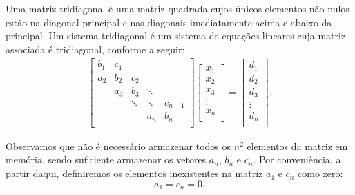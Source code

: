 Uma matriz tridiagonal é uma matriz quadrada cujos únicos elementos não nulos estão na diagonal principal e nas diagonais imediatamente acima e abaixo da principal. Um sistema tridiagonal é um sistema de equações lineares cuja matriz associada é tridiagonal, conforme a seguir:
\begin{eqnarray}\label{linsis:EqTriDiag} \begin{bmatrix}
   {b_1} & {c_1} & {   } & {   } & {   } \\
   {a_2} & {b_2} & {c_2} & {   } & {   } \\
   {   } & {a_3} & {b_3} & \ddots & {   } \\
   {   } & {   } & \ddots & \ddots & {c_{n-1}}\\
   {   } & {   } & {   } & {a_n} & {b_n}\\
\end{bmatrix}
\begin{bmatrix}
   {x_1 }  \\
   {x_2 }  \\
   {x_3 }  \\
   \vdots   \\
   {x_n }  \\
\end{bmatrix}
=
\begin{bmatrix}
   {d_1 }  \\
   {d_2 }  \\
   {d_3 }  \\
   \vdots   \\
   {d_n }  \\
\end{bmatrix}
.
\end{eqnarray}

Observamos que não é necessário armazenar todos os $n^2$ elementos da matriz em memória, sendo suficiente armazenar os vetores $a_n$, $b_n$ e $c_n$. Por conveniência, a partir daqui, definiremos os elementos inexistentes na matriz $a_1$ e $c_n$ como zero:
\begin{equation} a_1=c_n=0. \end{equation}

